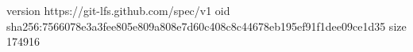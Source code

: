 version https://git-lfs.github.com/spec/v1
oid sha256:7566078e3a3fee805e809a808e7d60c408c8c44678eb195ef91f1dee09ce1d35
size 174916
